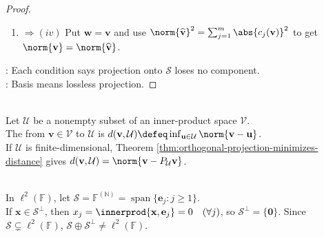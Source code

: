 \begin{theorem}
\begin{proof}
\begin{enumerate}[label=(\roman*).]
\item[$(v)$]$\Rightarrow (iv)$ Put $\mathbf{w}=\mathbf{v}$ and use $\norm{\widehat{\mathbf{v}}}^2=\sum_{j=1}^{m}\abs{c_j(\mathbf{v})}^2$ to get $\norm{\mathbf{v}}=\norm{\widehat{\mathbf{v}}}$.
\end{enumerate}
: Each condition says projection onto $\mathcal{S}$ loses no component.\\
: Basis means lossless projection.
\end{proof}
\end{theorem}

\begin{definition} \label{def:distance-to-subspace} \\
Let $\mathcal{U}$ be a nonempty subset of an inner-product space $\mathcal{V}$.\\
The  from $\mathbf{v}\in\mathcal{V}$ to $\mathcal{U}$ is $d(\mathbf{v},\mathcal{U})\defeq \inf_{\mathbf{u}\in\mathcal{U}}\norm{\mathbf{v}-\mathbf{u}}$.\\
If $\mathcal{U}$ is finite-dimensional, Theorem \ref{thm:orthogonal-projection-minimizes-distance} gives $d(\mathbf{v},\mathcal{U})=\norm{\mathbf{v}-P_{\mathcal{U}}\mathbf{v}}$.
\end{definition}

\begin{perspective} \label{per:projection-theorem-finite-dimensional-hypothesis} \\
In $\ell^2(\mathbb{F})$, let $\mathcal{S}=\mathbb{F}^{(\mathbb{N})}=\operatorname{span}\{\mathbf{e}_j:j\geq1\}$.\\
If $\mathbf{x}\in\mathcal{S}^{\perp}$, then $x_j=\innerprod{\mathbf{x},\mathbf{e}_j}=0\quad(\forall j)$, so $\mathcal{S}^{\perp}=\{\mathbf{0}\}$. Since $\mathcal{S}\subsetneq\ell^2(\mathbb{F})$, $\mathcal{S}\oplus\mathcal{S}^{\perp}\neq\ell^2(\mathbb{F})$.
\end{perspective}
